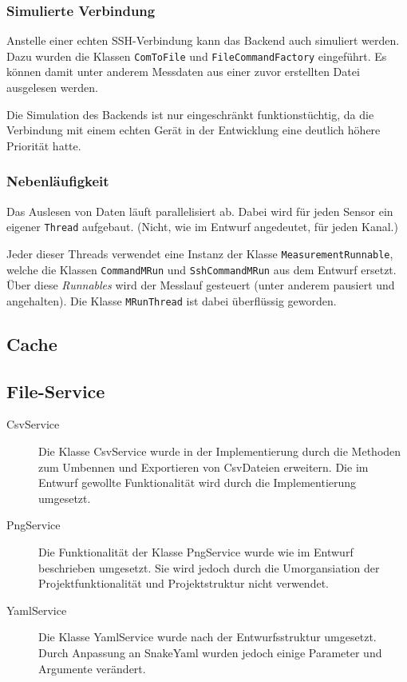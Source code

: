 \documentclass[parskip=full]{scrartcl}
\begin{document}
\subsubsection{Simulierte Verbindung}

Anstelle einer echten SSH-Verbindung kann das Backend auch simuliert werden. Dazu wurden die Klassen \verb:ComToFile: und \verb:FileCommandFactory: eingeführt. Es können damit unter anderem Messdaten aus einer zuvor erstellten Datei ausgelesen werden.

Die Simulation des Backends ist nur eingeschränkt funktionstüchtig, da die Verbindung mit einem echten Gerät in der Entwicklung eine deutlich höhere Priorität hatte.

\subsubsection{Nebenläufigkeit}

Das Auslesen von Daten läuft parallelisiert ab. Dabei wird für jeden Sensor ein eigener \verb:Thread: aufgebaut. (Nicht, wie im Entwurf angedeutet, für jeden Kanal.)

Jeder dieser Threads verwendet eine Instanz der Klasse \verb:MeasurementRunnable:, welche die Klassen \verb:CommandMRun: und \verb:SshCommandMRun: aus dem Entwurf ersetzt. Über diese \textit{Runnables} wird der Messlauf gesteuert (unter anderem pausiert und angehalten). Die Klasse \verb:MRunThread: ist dabei überflüssig geworden.

\subsection{Cache}

\subsection{File-Service}

\begin{description}
\item[CsvService] Die Klasse CsvService wurde in der Implementierung durch die Methoden zum Umbennen und Exportieren von CsvDateien erweitern. Die im Entwurf gewollte Funktionalität wird durch die Implementierung umgesetzt.
\item[PngService] Die Funktionalität der Klasse PngService wurde wie im Entwurf beschrieben umgesetzt. Sie wird jedoch durch die Umorgansiation der Projektfunktionalität und Projektstruktur nicht verwendet.
\item[YamlService] Die Klasse YamlService wurde nach der Entwurfsstruktur umgesetzt. Durch Anpassung an SnakeYaml wurden jedoch einige Parameter und Argumente verändert.

\end{description}
\end{document}
